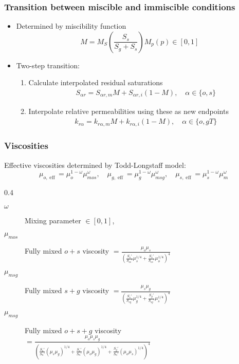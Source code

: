 \documentclass[screen, aspectratio=43]{beamer}
\DeclareMathOperator{\eff}{eff}
\begin{document}
\begin{frame}
  \frametitle{Transition between miscible and immiscible conditions}
  \begin{itemize}
  \item Determined by miscibility function
  \begin{equation*}
      M = M_S\left(\frac{S_s}{S_g + S_s}\right) M_p(p) \in [0,1]
    \end{equation*}
  \item Two-step transition:
    \begin{enumerate}
    \item Calculate interpolated residual saturations
      \begin{align*}
        S_{\alpha r} = S_{\alpha r,m}M + S_{\alpha r,i}(1-M), \quad \alpha \in \{o,s\}
      \end{align*}
    \item Interpolate relative permeabilities using these as new endpoints
      \begin{align*}
        k_{r \alpha} = k_{r\alpha,m}M + k_{r\alpha,i}(1-M), \quad \alpha \in \{o,gT\}
      \end{align*}
    \end{enumerate}
  \end{itemize}
\end{frame}

\begin{frame}
  \frametitle{Viscosities}
  \vspace{0.2cm}
  Effective viscosities determined by Todd-Longstaff model:
  \begin{equation*}
    \mu_{o, \eff} = \mu_o^{1-\omega}\mu_{mos}^\omega, \quad
    \mu_{g, \eff} = \mu_g^{1-\omega}\mu_{msg}^\omega, \quad
    \mu_{s, \eff} = \mu_s^{1-\omega}\mu_{m}^\omega
  \end{equation*}
  \vspace{0.2cm}
  \begin{mybox}{}{0.4\textheight}
    \begin{description}
    \item[$\omega$] Mixing parameter $\in [0,1]$,
    \item[$\mu_{mos}$] Fully mixed $o + s$ viscosity
      $= \frac{\mu_o \mu_s}{\left(\frac{S_o'}{S_{os}'}\mu_s^{1/4} +
          \frac{S_s'}{S_{os}'}\mu_o^{1/4}\right)^4}$
    \item[$\mu_{msg}$] Fully mixed $s + g$ viscosity
      $ = \frac{\mu_s \mu_g}{\left(\frac{S_s'}{S_{sg}'}\mu_g^{1/4} +
          \frac{S_g'}{S_{sg}'}\mu_s^{1/4}\right)^4}$
    \item[$\mu_{msg}$] Fully mixed $o +s + g$ viscosity \\
      \hfill $ = \frac{\mu_o \mu_s \mu_g}{\left(\frac{S_o'}{S_{n}'}(\mu_s\mu_g)^{1/4}
          + \frac{S_s'}{S_{n}'}(\mu_o\mu_g)^{1/4}
          + \frac{S_g'}{S_{n}'}(\mu_o\mu_s)^{1/4}\right)^4}$
    \end{description}
  \end{mybox}

\end{frame}
\end{document}
